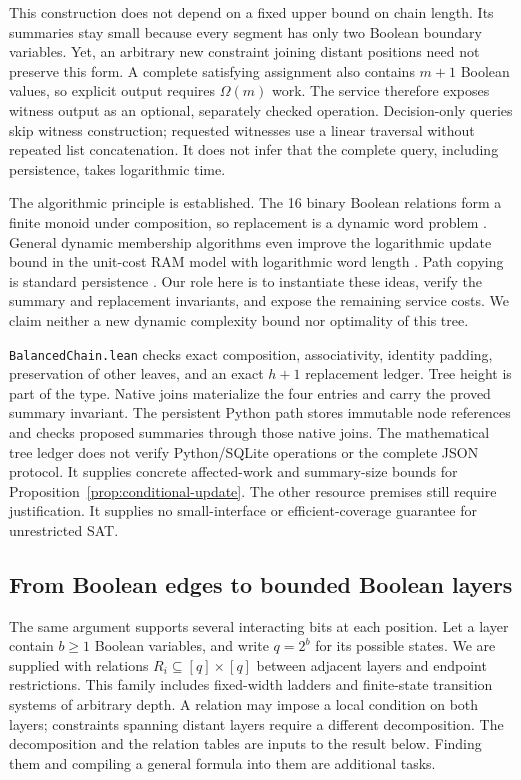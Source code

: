 \documentclass[11pt,a4paper]{article}
\numberwithin{equation}{section}
\theoremstyle{plain}
\theoremstyle{definition}
\theoremstyle{remark}
\begin{document}
This construction does not depend on a fixed upper bound on chain length. Its summaries stay small because every segment has only two Boolean boundary variables. Yet, an arbitrary new constraint joining distant positions need not preserve this form. A complete satisfying assignment also contains $m+1$ Boolean values, so explicit output requires $\Omega(m)$ work. The service therefore exposes witness output as an optional, separately checked operation. Decision-only queries skip witness construction; requested witnesses use a linear traversal without repeated list concatenation. It does not infer that the complete query, including persistence, takes logarithmic time.

The algorithmic principle is established. The 16 binary Boolean relations form a finite monoid under composition, so replacement is a dynamic word problem \citep{frandsen1997dynamic}. General dynamic membership algorithms even improve the logarithmic update bound in the unit-cost RAM model with logarithmic word length \citep{amarilli2021dynamic}. Path copying is standard persistence \citep{driscoll1989persistent}. Our role here is to instantiate these ideas, verify the summary and replacement invariants, and expose the remaining service costs. We claim neither a new dynamic complexity bound nor optimality of this tree.

\texttt{BalancedChain.lean} checks exact composition, associativity, identity padding, preservation of other leaves, and an exact $h+1$ replacement ledger. Tree height is part of the type. Native joins materialize the four entries and carry the proved summary invariant. The persistent Python path stores immutable node references and checks proposed summaries through those native joins. The mathematical tree ledger does not verify Python/SQLite operations or the complete JSON protocol. It supplies concrete affected-work and summary-size bounds for Proposition~\ref{prop:conditional-update}. The other resource premises still require justification. It supplies no small-interface or efficient-coverage guarantee for unrestricted SAT.

\subsection{From Boolean edges to bounded Boolean layers}
\label{sec:layered}

The same argument supports several interacting bits at each position. Let a layer contain $b\geq1$ Boolean variables, and write $q=2^b$ for its possible states. We are supplied with relations $R_i\subseteq[q]\times[q]$ between adjacent layers and endpoint restrictions. This family includes fixed-width ladders and finite-state transition systems of arbitrary depth. A relation may impose a local condition on both layers; constraints spanning distant layers require a different decomposition. The decomposition and the relation tables are inputs to the result below. Finding them and compiling a general formula into them are additional tasks.
\end{document}
